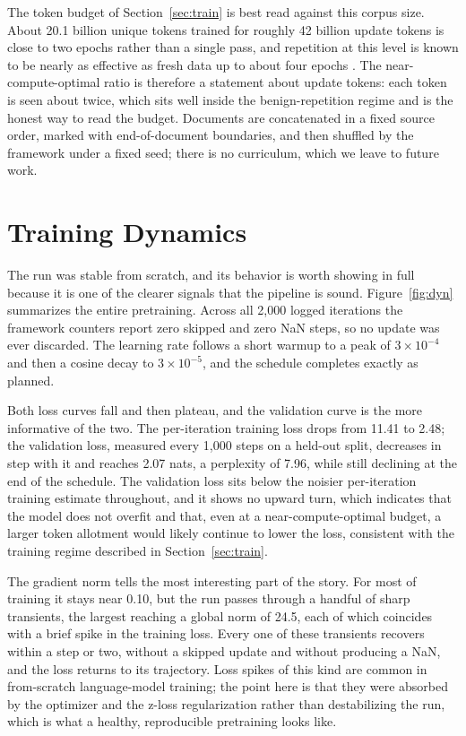 \documentclass[11pt]{article}
\begin{document}
The token budget of Section~\ref{sec:train} is best read against this corpus size. About
20.1 billion unique tokens trained for roughly 42 billion update tokens is close to two
epochs rather than a single pass, and repetition at this level is known to be nearly as
effective as fresh data up to about four epochs \cite{muennighoff}. The
near-compute-optimal ratio is therefore a statement about update tokens: each token is
seen about twice, which sits well inside the benign-repetition regime and is the honest
way to read the budget. Documents are concatenated in a fixed source order, marked with
end-of-document boundaries, and then shuffled by the framework under a fixed seed; there
is no curriculum, which we leave to future work.

\section{Training Dynamics}
\label{sec:dyn}

The run was stable from scratch, and its behavior is worth showing in full because it
is one of the clearer signals that the pipeline is sound. Figure~\ref{fig:dyn}
summarizes the entire pretraining. Across all 2{,}000 logged iterations the framework
counters report zero skipped and zero NaN steps, so no update was ever discarded. The
learning rate follows a short warmup to a peak of $3\times10^{-4}$ and then a cosine
decay to $3\times10^{-5}$, and the schedule completes exactly as planned.

Both loss curves fall and then plateau, and the validation curve is the more
informative of the two. The per-iteration training loss drops from 11.41 to 2.48; the
validation loss, measured every 1{,}000 steps on a held-out split, decreases in step
with it and reaches 2.07 nats, a perplexity of 7.96, while still declining at the end
of the schedule. The validation loss sits below the noisier per-iteration training
estimate throughout, and it shows no upward turn, which indicates that the model does
not overfit and that, even at a near-compute-optimal budget, a larger token allotment
would likely continue to lower the loss, consistent with the training regime described
in Section~\ref{sec:train}.

The gradient norm tells the most interesting part of the story. For most of training
it stays near 0.10, but the run passes through a handful of sharp transients, the
largest reaching a global norm of 24.5, each of which coincides with a brief spike in
the training loss. Every one of these transients recovers within a step or two,
without a skipped update and without producing a NaN, and the loss returns to its
trajectory. Loss spikes of this kind are common in from-scratch language-model
training; the point here is that they were absorbed by the optimizer and the z-loss
regularization rather than destabilizing the run, which is what a healthy, reproducible
pretraining looks like.
\end{document}
